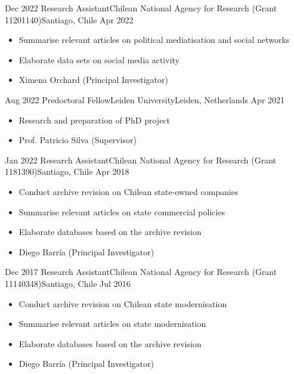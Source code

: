 \begin{experiences}
  \emptySeparator 
  \experience 
    {Dec 2022} {Research Assistant}{Chilean National Agency for Research (Grant 11201140)}{Santiago, Chile} {Apr 2022}
    {\begin{itemize}
    \item Summarise relevant articles on political mediatisation and social networks
    \item Elaborate data sets on social media activity
    \item Ximena Orchard {\small (Principal Investigator)}
    \end{itemize}}
    {}
\end{experiences}
\vspace{-2mm}

\begin{experiences}
  \emptySeparator 
  \experience 
    {Aug 2022} {Predoctoral Fellow}{Leiden University}{Leiden, Netherlands} {Apr 2021}
    {\begin{itemize}
    \item Research and preparation of PhD project
    \item Prof. Patricio Silva {\small (Supervisor)}
    \end{itemize}}
    {}
\end{experiences}
\vspace{-2mm}

\begin{experiences}
  \emptySeparator 
  \experience 
    {Jan 2022} {Research Assistant}{Chilean National Agency for Research (Grant 1181390)}{Santiago, Chile} {Apr 2018}
    {\begin{itemize}
    \item Conduct archive revision on Chilean state-owned companies
    \item Summarise relevant articles on state commercial policies
    \item Elaborate databases based on the archive revision
    \item Diego Barría {\small (Principal Investigator)}
    \end{itemize}}
    {}
\end{experiences}
\vspace{-2mm}

\begin{experiences}
  \emptySeparator 
  \experience 
    {Dec 2017} {Research Assistant}{Chilean National Agency for Research (Grant 11140348)}{Santiago, Chile} {Jul 2016}
    {\begin{itemize}
    \item Conduct archive revision on Chilean state modernisation
    \item Summarise relevant articles on state modernisation
    \item Elaborate databases based on the archive revision
    \item Diego Barría {\small (Principal Investigator)}
    \end{itemize}}
    {}
\end{experiences}
\vspace{-2mm}

